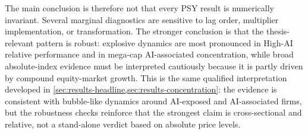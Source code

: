 The main conclusion is therefore not that every PSY result is numerically invariant. Several marginal diagnostics are sensitive to lag order, multiplier implementation, or transformation. The stronger conclusion is that the thesis-relevant pattern is robust: explosive dynamics are most pronounced in High-AI relative performance and in mega-cap AI-associated concentration, while broad absolute-index evidence must be interpreted cautiously because it is partly driven by compound equity-market growth. This is the same qualified interpretation developed in \cref{sec:results-headline,sec:results-concentration}: the evidence is consistent with bubble-like dynamics around AI-exposed and AI-associated firms, but the robustness checks reinforce that the strongest claim is cross-sectional and relative, not a stand-alone verdict based on absolute price levels.
